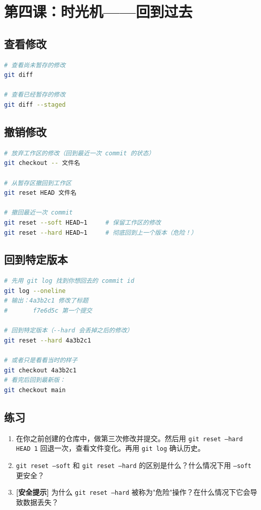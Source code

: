 \documentclass[a4paper,12pt]{ctexart}
\begin{document}
\section*{第四课：时光机——回到过去}

\subsection*{查看修改}

\begin{lstlisting}[language=bash]
# 查看尚未暂存的修改
git diff

# 查看已经暂存的修改
git diff --staged
\end{lstlisting}

\subsection*{撤销修改}

\begin{lstlisting}[language=bash]
# 放弃工作区的修改（回到最近一次 commit 的状态）
git checkout -- 文件名

# 从暂存区撤回到工作区
git reset HEAD 文件名

# 撤回最近一次 commit
git reset --soft HEAD~1     # 保留工作区的修改
git reset --hard HEAD~1     # 彻底回到上一个版本（危险！）
\end{lstlisting}

\subsection*{回到特定版本}

\begin{lstlisting}[language=bash]
# 先用 git log 找到你想回去的 commit id
git log --oneline
# 输出：4a3b2c1 修改了标题
#       f7e6d5c 第一个提交

# 回到特定版本（--hard 会丢掉之后的修改）
git reset --hard 4a3b2c1

# 或者只是看看当时的样子
git checkout 4a3b2c1
# 看完后回到最新版：
git checkout main
\end{lstlisting}

\subsection*{练习}

\begin{enumerate}
  \item 在你之前创建的仓库中，做第三次修改并提交。然后用 \texttt{git reset --hard HEAD~1} 回退一次，查看文件变化。再用 \texttt{git log} 确认历史。
  \item \texttt{git reset --soft} 和 \texttt{git reset --hard} 的区别是什么？什么情况下用 \texttt{--soft} 更安全？
  \item \textbf{[安全提示]} 为什么 \texttt{git reset --hard} 被称为"危险"操作？在什么情况下它会导致数据丢失？
\end{enumerate}
\end{document}
